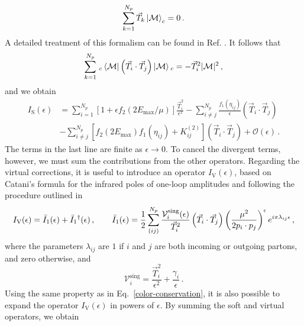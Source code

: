 \documentclass[a4paper, 12pt]{book}
\begin{document}
\begin{equation}
  \sum_{k=1}^{N_p} \vec{T}_k  \ket{\mathcal{M}}_c = 0 \, .
\end{equation}
A detailed treatment of this formalism can be found in Ref. \cite{Catani:1996vz}. It follows that 
\begin{equation}
  \sum_{k=1}^{N_p} \, {}_c \bra{\mathcal{M}} \left( \vec{T}_i \cdot \vec{T}_j\right) \ket{\mathcal{M}} {}_c= - \vec{T}^2_i |\mathcal{M}|^2 \, ,
  \label{color-conservation}
\end{equation}
and we obtain
\begin{equation}
  \begin{aligned}
  I_{\mathrm{S}}(\epsilon)  &= \sum_{i=1}^{N_p}  \left[1+\epsilon f_2(2E_{\mathrm{max}}/\mu)\right] \frac{\vec{T}_i^2}{\epsilon^2}- \sum_{i\neq j}^{N_p} \frac{f_1(\eta_{ij})}{\epsilon} \left( \vec{T}_i \cdot \vec{T}_j\right) \\
 & - \sum_{i\neq j}^{N_p} \left[ f_2 \left(2 E_{\mathrm{max}}\right) f_1(\eta_{ij}) + K_{ij}^{(2)}\right] (\vec{T}_i \cdot \vec{T}_j) + \mathcal{O}(\epsilon) \,.
  \end{aligned}
\end{equation}
The terms in the last line are finite as $\epsilon \to 0$. To cancel the divergent terms, however, we must sum the contributions from the other operators. Regarding the virtual corrections, it is useful to introduce an operator $I_{\mathrm{V}}(\epsilon)$, based on Catani's formula for the infrared poles of one-loop amplitudes \cite{Catani:1998bh} and following the procedure outlined in \cite{Devoto:2023rpv}
\begin{equation}
  I_{\mathrm{V}}(\epsilon) = \bar{I}_1 (\epsilon) + \bar{I}_1\textsuperscript{\textdagger} (\epsilon) \,, \qquad \bar{I}_1 (\epsilon)= \frac{1}{2} \sum_{(ij)}^{N_p} \frac{\mathcal{V}_i^{\mathrm{sing}}(\epsilon)}{\vec{T}_i^2} \left( \vec{T}_i \cdot \vec{T}_j\right) \left(\frac{\mu^2}{2p_i \cdot p_j}\right)^{\epsilon} e^{i \pi \lambda_{ij} \epsilon} \, ,
\end{equation}
where the parameters $\lambda_{ij}$ are $1$ if $i$ and $j$ are both incoming or outgoing partons, and zero otherwise, and 
\begin{equation}
  \mathcal{V}_i^{\mathrm{sing}}= \frac{\vec{T}_i^2}{\epsilon^2} + \frac{\gamma_i}{\epsilon} \,. 
\end{equation}
Using the same property as in Eq.~\ref{color-conservation}, it is also possible to expand the operator $I_{\mathrm{V}}(\epsilon)$ in powers of $\epsilon$. By summing the soft and virtual operators, we obtain
\end{document}
